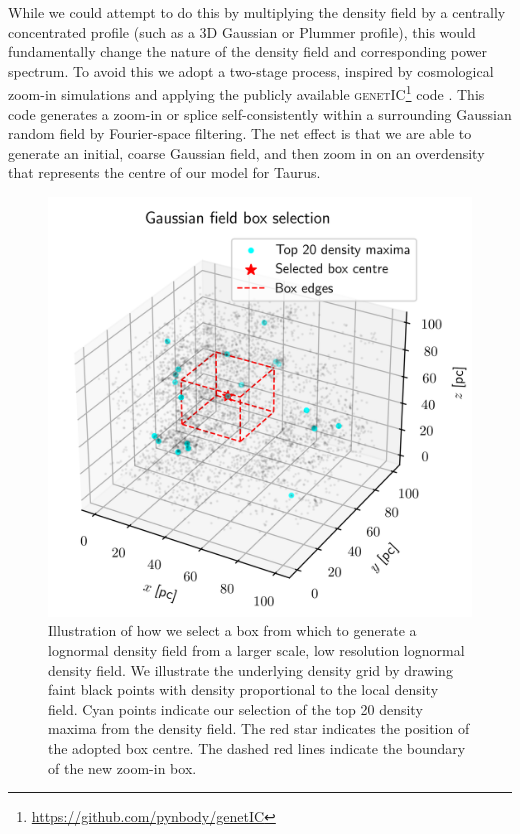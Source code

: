\documentclass{aa}
\begin{document}
While we could attempt to do this by multiplying the density field by a centrally concentrated profile (such as a 3D Gaussian or Plummer profile), this would fundamentally change the nature of the density field and corresponding power spectrum. To avoid this we adopt a two-stage process, inspired by cosmological zoom-in simulations and applying the publicly available \textsc{genetIC}\footnote{\url{https://github.com/pynbody/genetIC}} code \citep{Stopyra20,Stopyra21}. This code generates a zoom-in or splice \citep{Cadiou21} self-consistently within a surrounding Gaussian random field by Fourier-space filtering. The net effect is that we are able to generate an initial, coarse Gaussian field, and then zoom in on an overdensity that represents the centre of our model for Taurus. 


\begin{figure}
    \centering
    \includegraphics[width=\columnwidth]{Figures/box_selection.png}
    \caption{Illustration of how we select a box from which to generate a lognormal density field from a larger scale, low resolution lognormal density field. We illustrate the underlying density grid by drawing faint black points with density proportional to the local density field. Cyan points indicate our selection of the top 20 density maxima from the density field. The red star indicates the position of the adopted box centre. The dashed red lines indicate the boundary of the new zoom-in box. }
    \label{fig:box_selection}
\end{figure}
\end{document}
